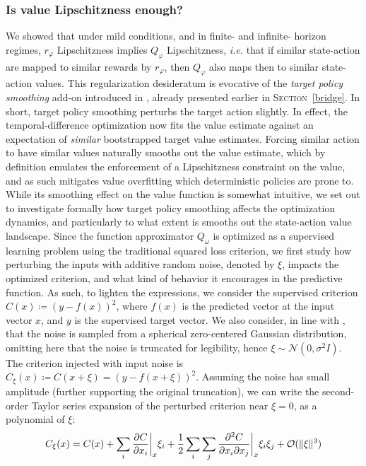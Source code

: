 \subsubsection{Is value Lipschitzness enough?}
\label{notenough}

We showed that under mild conditions, and in finite- and infinite- horizon regimes,
$r_\varphi$ Lipschitzness implies $Q_\varphi$ Lipschitzness, \textit{i.e.}
that if similar state-action are mapped to similar rewards by $r_\varphi$,
then $Q_\varphi$ also maps then to similar state-action values.
This regularization desideratum is evocative of the
\emph{target policy smoothing} add-on introduced in \cite{Fujimoto2018-pe},
already presented earlier in \textsc{Section}~\ref{bridge}.
In short, target policy smoothing perturbs the target action slightly.
In effect, the temporal-difference optimization now fits the value estimate against an expectation
of \emph{similar} bootstrapped target value estimates.
Forcing similar action to have similar values naturally smooths out the value estimate,
which by definition emulates the enforcement of a Lipschitzness constraint on the value,
and as such mitigates value overfitting which
deterministic policies are prone to.
While its smoothing effect on the value function is somewhat intuitive,
we set out to investigate formally how target policy smoothing
affects the optimization dynamics, and particularly to what extent is smooths out
the state-action value landscape.
Since the function approximator $Q_\omega$ is optimized as a supervised learning problem
using the traditional squared loss criterion, we first study how perturbing the inputs with
additive random noise, denoted by $\xi$, impacts the optimized criterion,
and what kind of behavior it encourages in the predictive function.
As such, to lighten the expressions, we consider the supervised criterion
$C(x) \coloneqq (y - f(x))^2$,
where $f(x)$ is the predicted vector
at the input vector $x$, and $y$ is the supervised target vector.
We also consider, in line with \cite{Fujimoto2018-pe}, that the noise is
sampled from a spherical zero-centered Gaussian distribution,
omitting here that the noise is truncated for legibility,
hence $\xi \sim \mathcal{N}(0, \sigma^2 I)$.
The criterion injected with input noise is
$C_\xi (x) \coloneqq C (x + \xi) = (y - f(x + \xi))^2$.
Assuming the noise has small amplitude (further supporting the original truncation),
we can write the second-order Taylor series expansion of the perturbed criterion near $\xi=0$,
as a polynomial of $\xi$:
\begin{align}
C_\xi (x) = C(x)
+ \sum_i \pdv{C}{x_i} \bigg\rvert_{x} \xi_i
+ \frac{1}{2} \sum_i\sum_j \pdv{C}{x_i}{x_j} \bigg\rvert_{x} \xi_i \xi_j
+ \mathcal{O}(\lVert \xi \rVert ^3)
\end{align}
